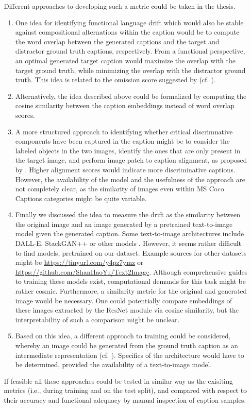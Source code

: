 Different approaches to developing such a metric could be taken in the thesis. 
\begin{enumerate}
	\item One idea for identifying functional language drift which would also be stable against compositional alternations within the caption would be to compute the word overlap between the generated captions and the target and distractor ground truth captions, respectively. From a functional perspective, an optimal generated target caption would maximize the overlap with the target ground truth, while minimizing the overlap with the distractor ground truth. This idea is related to the omission score suggested by \cite{havrylov2017emergence} (cf. \cite{andreas2016reasoning, gunel2020supervised}).
	\item Alternatively, the idea described above could be formalized by computing the cosine similarity between the caption embeddings instead of word overlap scores. 
	\item A more structured approach to identifying whether critical discrimnative components have been captured in the caption might be to consider the labeled objects in the two images, identify the ones that are only present in the target image, and perform image patch to caption alignment, as proposed by \cite{karpathy2015deep}. Higher alignment scores would indicate more discriminative captions. However, the availability of the model and the usefulness of the approach are not completely clear, as the similarity of images even within MS Coco Captions categories might be quite variable.
	\item Finally we discussed the idea to measure the drift as the similarity between the original image and an image generated by a pretrained text-to-image model given the generated caption. Some text-to-image architectures include DALL-E, StackGAN++ or other models \cite{ramesh2021zero, zhang2018stackgan++, zhou2021lafite}. However, it seems rather difficult to find models, pretrained on our dataset. Example sources for other datasets might be \url{https://tinyurl.com/y4pz7ymz} or \url{https://github.com/ShanHaoYu/Text2Image}. Although comprehensive guides to training these models exist, computational demands for this task might be rather cosmic.
	Furthermore, a similarity metric for the original and generated image would be necessary. One could potentially compare embeddings of these images extracted by the ResNet module via cosine similarity, but the interpretability of such a comparison might be unclear.  
	\item Based on this idea, a different approach to training could be considered, whereby an image could be generated from the ground truth caption as an intermediate representation (cf. \cite{lee2019countering}). Specifics of the architecture would have to be determined, provided the availability of a text-to-image model.  
\end{enumerate}
If feasible all these approaches could be tested in similar way as the exisiting metrics (i.e., during training and on the test split), and compared with respect to their accuracy and functional adequacy by manual inspection of caption samples. 